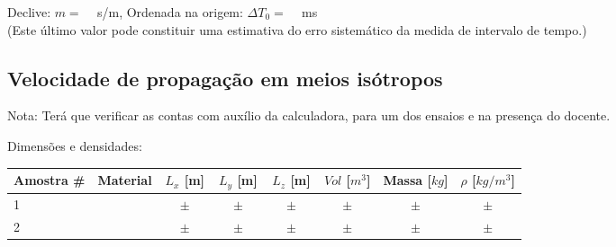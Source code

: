 \documentclass[a4paper,12pt]{article}  %
\begin{document}
Declive: $m=$ ~\underline{\makebox[1cm][r]{~}} s/m, Ordenada na origem: $\Delta T_0=$ ~\underline{\makebox[1cm][r]{~}} ms\\
(Este último valor pode constituir uma estimativa do erro sistemático da medida de intervalo de tempo.)

\subsection{\sf Velocidade de propagação em meios isótropos}%

Nota: Terá que verificar as contas com auxílio da calculadora, para um dos ensaios e na presença do docente.



Dimensões e densidades:
\begin{center}
	\begin{tabular}{|l|c|c|c|c|c|c|c|}
	\hline
	 Amostra \# & Material  &  $L_x$ [m]  &   $L_y$ [m]  &  $L_z$ [m]  & $Vol$ [$m^3$]  & Massa [$kg$] & $\rho$ [$kg/m^3$] \\
	\hline \hline
	  1   &   & $ \quad \pm \quad $ &  $ \quad \pm \quad $ & $ \quad \pm \quad $ & $ \quad \pm \quad $ & $ \quad \pm \quad $ & $ \quad \pm \quad $ \\ \hline
	  2   &   & $ \quad \pm \quad $ &  $ \quad \pm \quad $ & $ \quad \pm \quad $ & $ \quad \pm \quad $ & $ \quad \pm \quad $ & $ \quad \pm \quad $ \\ \hline
				\end{tabular}
\end{center}

\end{document}
